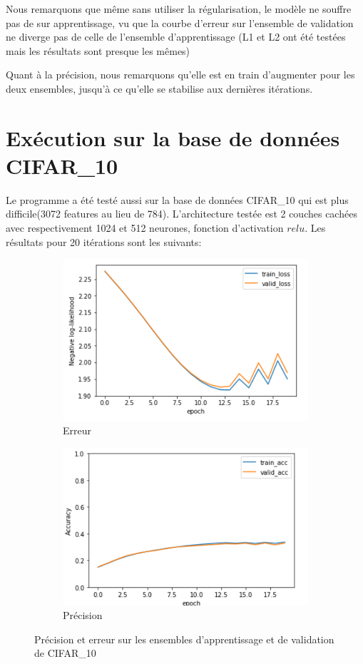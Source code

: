 \documentclass[a4paper,english,12pt]{article}
\begin{document}
Nous remarquons que même sans utiliser la régularisation, le modèle ne souffre pas de sur apprentissage, vu que la courbe d'erreur sur l'ensemble de validation ne diverge pas de celle de l'ensemble d'apprentissage (L1 et L2 ont été testées mais les résultats sont presque les mêmes)

Quant à la précision, nous remarquons qu'elle est en train d'augmenter pour les deux ensembles, jusqu'à ce qu'elle se stabilise aux dernières itérations.

\section{Exécution sur la base de données CIFAR\_10}
Le programme a été testé aussi sur la base de données CIFAR\_10 qui est plus difficile(3072 features au lieu de 784). L'architecture testée est 2 couches cachées avec respectivement 1024 et 512 neurones, fonction d'activation $relu$. Les résultats pour 20 itérations sont les suivants:

\begin{figure}[H]
	\centering
	\begin{subfigure}{0.45\textwidth}
		\includegraphics[width=\textwidth]{error_cifar10}
		\caption{Erreur}
	\end{subfigure}
	\begin{subfigure}{0.45\textwidth}
		\includegraphics[width=\textwidth]{accuracy_cifar10}
		\caption{Précision}
	\end{subfigure}
	\caption{Précision et erreur sur les ensembles d'apprentissage et de validation de CIFAR\_10}
\end{figure}
\end{document}
